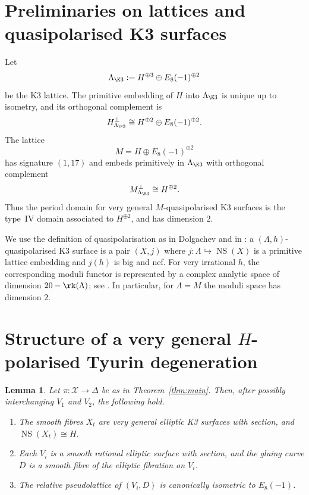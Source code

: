 \documentclass[11pt]{amsart}
\newtheorem{lemma}{Lemma}
\theoremstyle{definition}
\DeclareMathOperator{\NS}{NS}
\newcommand{\cX}{\mathcal X}
\begin{document}
\section{Preliminaries on lattices and quasipolarised K3 surfaces}

Let
\[
\Lambda_{\K3}:=H^{\oplus 3}\oplus E_8(-1)^{\oplus 2}
\]
be the K3 lattice. The primitive embedding of $H$ into $\Lambda_{\K3}$ is unique up to isometry, and its orthogonal complement is
\[
H^\perp_{\Lambda_{\K3}}\cong H^{\oplus 2}\oplus E_8(-1)^{\oplus 2}.
\]
The lattice
\[
M=H\oplus E_8(-1)^{\oplus 2}
\]
has signature $(1,17)$ and embeds primitively in $\Lambda_{\K3}$ with orthogonal complement
\[
M^\perp_{\Lambda_{\K3}}\cong H^{\oplus 2}.
\]
Thus the period domain for very general $M$-quasipolarised K3 surfaces is the type~IV domain associated to $H^{\oplus 2}$, and has dimension $2$.

We use the definition of quasipolarisation as in Dolgachev and in \cite{GT24}: a $(\Lambda,h)$-quasipolarised K3 surface is a pair $(X,j)$ where $j\colon \Lambda\hookrightarrow \NS(X)$ is a primitive lattice embedding and $j(h)$ is big and nef. For very irrational $h$, the corresponding moduli functor is represented by a complex analytic space of dimension $20-\rk(\Lambda)$; see \cite[Definition~4.2, Theorem~4.7]{GT24}. In particular, for $\Lambda=M$ the moduli space has dimension $2$.

\section{Structure of a very general $H$-polarised Tyurin degeneration}

\begin{lemma}\label{lem:Tyurin-structure}
Let $\pi\colon \cX\to\Delta$ be as in Theorem~\ref{thm:main}. Then, after possibly interchanging $V_1$ and $V_2$, the following hold.
\begin{enumerate}
\item The smooth fibres $X_t$ are very general elliptic K3 surfaces with section, and $\NS(X_t)\cong H$.
\item Each $V_i$ is a smooth rational elliptic surface with section, and the gluing curve $D$ is a smooth fibre of the elliptic fibration on $V_i$.
\item The relative pseudolattice of $(V_i,D)$ is canonically isometric to $E_8(-1)$.
\end{enumerate}
\end{lemma}
\end{document}
